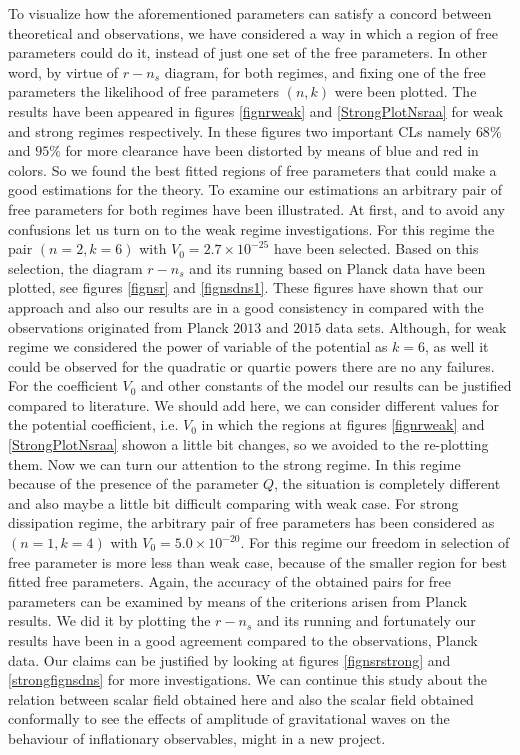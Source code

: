 \documentclass[12pt]{revtex4}
\begin{document}
To visualize how the aforementioned parameters  can satisfy a concord between theoretical and observations, we {have considered }a way in which a region of free parameters could do it, instead of just one set of the free parameters. In other word, by virtue of $r-n_s$ diagram, for both regimes, and fixing one of the free parameters the likelihood of free parameters  $(n, k)$ {were} been plotted. The results have been appeared in figures \ref{fignrweak}   and \ref{StrongPlotNsraa}   for weak and strong regimes respectively. In these figures two important CLs namely $68\%$ and $95\%$ for more clearance have been distorted  by means of  blue and red in colors. So we found the best fitted regions of free parameters that could make a good estimations for the theory. To examine our estimations an arbitrary pair of free parameters for both regimes have been illustrated. At first, and to avoid any confusions let us turn on to the weak regime investigations. For this regime the pair $(n=2, k=6)$ with $V_0=2.7\times 10^{-25}$ have been selected. Based on this selection, the diagram {$r-n_s$} and its running based on Planck data have been plotted, see figures \ref{fignsr} and \ref{fignsdns1}. These figures {have } shown that our approach and also our results are in a good consistency in compared with the observations originated from Planck $2013$ and $2015$ data sets. Although, for weak regime we considered the power {of variable}  of the potential as $k=6$, as well it could be observed for the quadratic or quartic powers there are no any failures. For the coefficient $V_0$ and other constants of the model our results can be justified compared to literature. {We should add here, we can consider different values for the potential coefficient, i.e. $V_0$ in which  the regions at  figures \ref{fignrweak}   and \ref{StrongPlotNsraa}  showon a little bit changes, so we avoided  to  the re-plotting  them}. Now we can turn our attention to the strong regime. In this regime because of the presence of the parameter $Q$, the situation is completely different and also maybe a little bit difficult comparing with weak case. For strong dissipation regime, the arbitrary pair of free parameters has been considered as $(n=1, k=4)$ with $V_0=5.0\times 10^{-20}$. For this regime our freedom in selection of free parameter is more less than weak case, because of the smaller region for best fitted free parameters. Again, the accuracy of the obtained pairs for free parameters can be examined by means of the criterions {arisen} from Planck results. We did it by plotting the { $r-n_s$} and its running and fortunately our results  have been in a good agreement compared to the observations, Planck data. Our claims can be justified by looking at figures \ref{fignsrstrong}   and \ref{strongfignsdns} for more investigations. We can continue this study  about the relation between scalar field obtained here and also the scalar field obtained conformally to see the effects of amplitude of gravitational  waves on the behaviour of inflationary observables, might in a new project.
\end{document}
